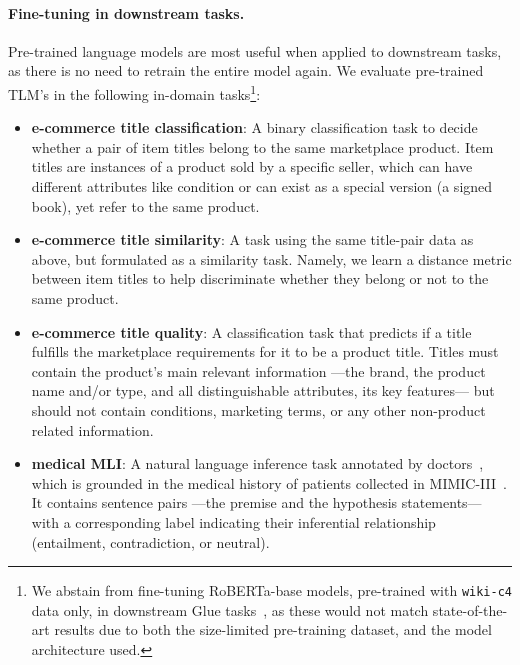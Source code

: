 \vspace*{-1ex}
\paragraph*{Fine-tuning in downstream tasks.} \hspace*{-2ex}
Pre-trained language models are most useful when applied to downstream tasks,
as there is no need to retrain the entire model again.
We evaluate pre-trained TLM's in the following in-domain tasks\footnote{
	We abstain from fine-tuning RoBERTa-base models, pre-trained with \texttt{wiki-c4} data only, in downstream Glue tasks~\citep{glue},
	as these would not match state-of-the-art results due to both the size-limited pre-training dataset, and the model architecture used.
}:

\begin{itemize}[leftmargin=*]
	\item \textbf{e-commerce title classification}: A binary classification task to decide whether a pair of item titles belong to the same marketplace product.
	Item titles are instances of a product sold by a specific seller, which can have different attributes like condition or can exist as a special version (\eg a signed book), yet refer to the same product.
	
	\item \textbf{e-commerce title similarity}: A task using the same title-pair data as above, but formulated as a similarity task.
	Namely, we learn a distance metric between item titles to help discriminate whether they belong or not to the same product.
	
	\item \textbf{e-commerce title quality}: A classification task that predicts if a title fulfills the marketplace requirements for it to be a product title.
	Titles must contain the product's main relevant information
	---the brand, the product name and/or type, and all distinguishable attributes, \ie its key features---
	but should not contain conditions, marketing terms, or any other non-product related information.
	
	\item \textbf{medical MLI}: A natural language inference task annotated by doctors~\citep{medMLI},
	which is grounded in the medical history of patients collected in MIMIC-III~\citep{mimic}.
	It contains sentence pairs ---the premise and the hypothesis statements--- with a corresponding label indicating their inferential relationship (\eg entailment, contradiction, or neutral).
\end{itemize}

